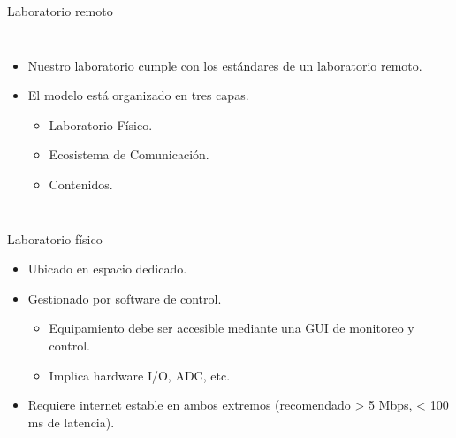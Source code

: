 \begin{frame}{Laboratorio remoto}
\begin{columns}[c] %

\begin{itemize}
	\item Nuestro laboratorio cumple con los estándares de un laboratorio remoto.
    \item El modelo está organizado en tres capas.
    \begin{itemize}
        \item Laboratorio Físico.
        \item Ecosistema de Comunicación.
        \item Contenidos.
    \end{itemize}

\end{itemize}



\end{columns}
\end{frame}

\begin{frame}{Laboratorio físico}
\begin{itemize}
    \item Ubicado en espacio dedicado.
    \item Gestionado por software de control.
    \begin{itemize}
    	\item Equipamiento debe ser accesible mediante una GUI de monitoreo y control.
    	\item Implica hardware I/O, ADC, etc.
	\end{itemize}
    \item Requiere internet estable en ambos extremos (recomendado > 5 Mbps, < 100 ms de latencia).
\end{itemize}
\end{frame}

